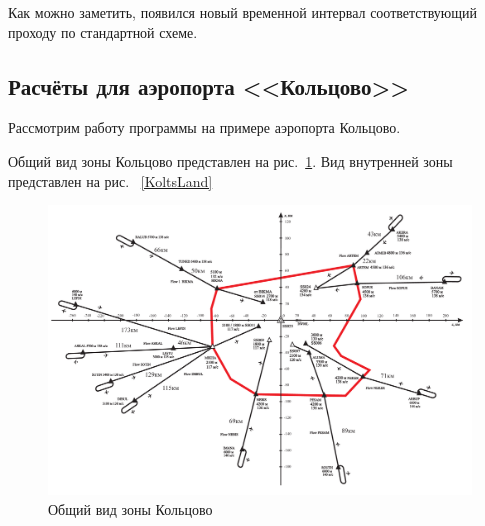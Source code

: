 \documentclass[12pt, a4 paper]{article}
\begin{document}
Как можно заметить, появился новый временной интервал соответствующий проходу по стандартной схеме.

\newpage



\subsection{Расчёты для аэропорта <<Кольцово>>}

Рассмотрим работу программы на примере аэропорта Кольцово.

Общий вид зоны Кольцово представлен на рис.~\ref{KoltsAll}. Вид внутренней зоны представлен на рис.~ \ref{KoltsLand}

\begin{figure}[h]
  \begin{center}
      \includegraphics[scale=0.25]{Koltsovo01.png}
        \caption{Общий вид зоны Кольцово}                                                                             
    \label{KoltsAll}
  \end{center}
\end{figure}
\end{document}
